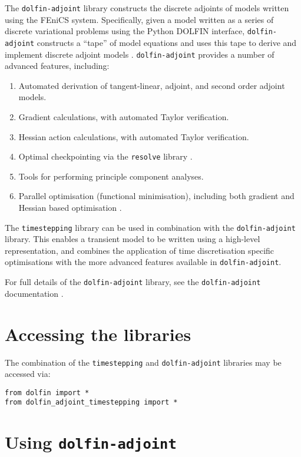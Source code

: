 \documentclass[a4paper]{book}
\begin{document}
The \verb+dolfin-adjoint+ library constructs the discrete adjoints of models
written using the FEniCS system. Specifically, given a model written as a series
of discrete variational problems using the Python DOLFIN interface,
\verb+dolfin-adjoint+ constructs a ``tape'' of model equations and uses this
tape to derive and implement discrete adjoint models \citep{farrell2012}.
\verb+dolfin-adjoint+ provides a number of advanced features, including:
\begin{enumerate}
  \item Automated derivation of tangent-linear, adjoint, and second order
        adjoint models.
  \item Gradient calculations, with automated Taylor verification.
  \item Hessian action calculations, with automated Taylor verification. 
  \item Optimal checkpointing via the \verb+resolve+ library
        \citep{griewank2000}.
  \item Tools for performing principle component analyses.
  \item Parallel optimisation (functional minimisation), including both gradient
        and Hessian based optimisation \citep{funke2013}.
\end{enumerate}

The \verb+timestepping+ library can be used in combination with the \linebreak
\verb+dolfin-adjoint+ library. This enables a transient model to be written
using a high-level representation, and combines the application of time
discretisation specific optimisations with the more advanced features available
in \linebreak \verb+dolfin-adjoint+.

For full details of the \verb+dolfin-adjoint+ library, see the
\verb+dolfin-adjoint+ documentation \citep{da}.

\section{Accessing the libraries}

The combination of the \verb+timestepping+ and \verb+dolfin-adjoint+ libraries
may be accessed via:
\begin{lstlisting}
from dolfin import *
from dolfin_adjoint_timestepping import *
\end{lstlisting}

\section{Using \texttt{dolfin-adjoint}}
\end{document}
